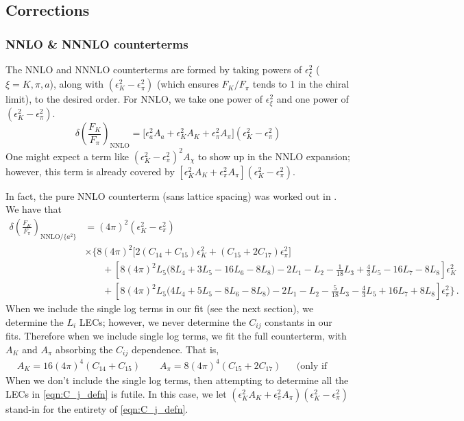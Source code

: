 \documentclass[prd,tightenlines,preprintnumbers,showpacs,superscriptaddress,notitlepage,eqsecnum,floatfix,notitlepage]{revtex4-1}
\begin{document}
\subsection{Corrections}

\subsubsection{NNLO \& NNNLO counterterms}
The NNLO and NNNLO counterterms are formed by taking powers of $\epsilon^2_\xi$ ($\xi = K, \pi, a$), along with $(\epsilon_K^2 - \epsilon_\pi^2)$ (which ensures $F_K / F_\pi$ tends to 1 in the chiral limit), to the desired order. For NNLO, we take one power of $\epsilon^2_\xi$ and one power of $(\epsilon_K^2 - \epsilon_\pi^2)$.
\begin{equation}
\delta\left(\frac{F_K}{F_\pi}\right)_\text{NNLO} = \bigg[
\epsilon_a^2  A_{a}
+\epsilon_K^2  A_{K}
+\epsilon_\pi^2  A_{\pi}
\bigg] (\epsilon_K^2 - \epsilon_\pi^2)
\end{equation}
One might expect a term like $(\epsilon_K^2 - \epsilon_\pi^2)^2 A_{\chi}$ to show up in the NNLO expansion; however, this term is already covered by $[\epsilon_K^2  A_{K}+\epsilon_\pi^2  A_{\pi}] (\epsilon_K^2 - \epsilon_\pi^2)$.

In fact, the pure NNLO counterterm (sans lattice spacing) was worked out in  \cite{Ananthanarayan:2017qmx}. We have that
\begin{align} \label{eqn:C_j_defn}
\delta\left(\frac{F_K}{F_\pi}\right)_{\text{NNLO} / \{a^2 \}}
&= (4 \pi)^2 \left(\epsilon_K^2 - \epsilon_\pi^2\right) \\
&\times \Bigg\{ 
8 (4 \pi)^2 \big[ 2 \left(C_{14} + C_{15}\right) \epsilon_K^2 + \left( C_{15} + 2 C_{17} \right) \epsilon_\pi^2 \big] \nonumber \\
&\phantom{= \Bigg\}} +  \left[ 8 (4 \pi)^2 L_5  \big( 8 L_4 + 3L_5 - 16 L_6 -8L_8 \big)
-2 L_1 - L_2 - \frac{1}{18} L_3 + \frac{4}{3} L_5 - 16 L_7 - 8 L_8
\right] \epsilon_K^2 \nonumber \\
&\phantom{= \Bigg\}} +  \left[ 8 (4 \pi)^2  L_5  \big( 4 L_4 + 5 L_5 - 8 L_6 - 8 L_8 \big)
-2 L_1 - L_2 - \frac{5}{18} L_3 - \frac{4}{3} L_5 + 16 L_7 + 8 L_8
\right] \epsilon_\pi^2 \nonumber 
\Bigg\} \, .
\end{align}
When we include the single log terms in our fit (see the next section), we determine the $L_i$ LECs; however, we never determine the $C_{ij}$ constants in our fits. Therefore when we include single log terms, we fit the full counterterm, with $A_K$ and $A_\pi$ absorbing the $C_{ij}$ dependence. That is,
\begin{align}
&A_K = 16 (4 \pi)^4 (C_{14} + C_{15}) \qquad A_\pi = 8 (4 \pi)^4 (C_{15} + 2 C_{17}) &&  \text{(only if including single log terms)}
\end{align}
When we don't include the single log terms, then attempting to determine all the LECs in \eqref{eqn:C_j_defn} is futile. In this case, we let $(\epsilon_K^2  A_{K} +\epsilon_\pi^2  A_{\pi}) (\epsilon_K^2 - \epsilon_\pi^2)$ stand-in for the entirety of \eqref{eqn:C_j_defn}.
\end{document}
